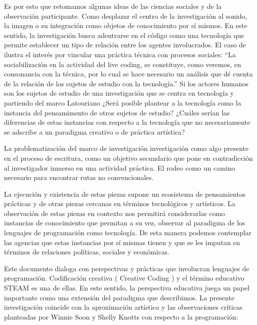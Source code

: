 
Es por esto que retomamos algunas ideas de las ciencias sociales y de la observación participante. Como desplazar el centro de la investigación al sonido, la imagen o su integración como objetos de conocimiento por sí mismos. En este sentido, la investigación busca adentrarse en el código como una tecnología que permite establecer un tipo de relación entre los agentes involucrados. El caso de \cite{diProspero} ilustra el interés por vincular una práctica técnica con procesos sociales: ``La sociabilización en la actividad del live coding, se constituye, como veremos, en consonancia con la técnica, por lo cual se hace necesario un análisis que dé cuenta de la relación de los sujetos de estudio con la tecnología.''\citep[p.~48]{diProspero} Si los actores humanos son los sujetos de estudio de una investigación que se centra en tecnología y partiendo del marco Latouriano ¿Será posible plantear a la tecnología como la instancia del pensamimento de otros sujetos de estudio? ¿Cuáles serían las diferencias de estas instancias con respecto a la tecnología que no necesariamente se adscribe a un paradigma creativo o de práctica artística?

La problematización del marco de investigación investigación como algo presente en el proceso de escritura, como un objetivo secundario que pone en contradicción al investigador inmerso en una actividad práctica. El rodeo como un camino necesario para encontrar rutas no convencionales.

La ejecución y existencia de estas piezas supone un ecosistema de pensamientos prácticas y de otras piezas cercanas en términos tecnológicos y artísticos. La observación de estas piezas en contexto nos permitirá considerarlas como instancias de conocimiento que permitan a su vez, observar al paradigma de los lenguajes de programación como tecnología. De esta manera podemos contemplar las agencias que estas instancias por sí mismas tienen y que se les imputan en términos de relaciones políticas, sociales y económicas.

Este documento dialoga con perspectivas y prácticas que involucran lenguajes de programación. Codificación creativa ( Creative Coding ) y el término educativo STEAM es una de ellas. En este sentido, la perspectiva educativa juega un papel importante como una extensión del paradigma que describimos. La presente investigación coincide con la aproximación artística y las observaciones críticas planteadas por Winnie Soon y Shelly Knotts con respecto a la programación:

